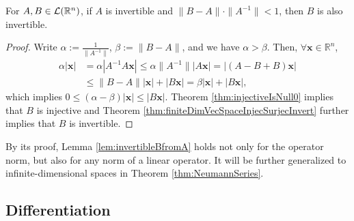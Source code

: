 
\begin{lem}
  \label{lem:invertibleBfromA}
  For $A,B\in {\cal L}(\mathbb{R}^n)$,
  if $A$ is invertible and $\|B-A\|\cdot\|A^{-1}\|<1$,
  then $B$ is also invertible.
\end{lem}
\begin{proof}
  Write $\alpha := \frac{1}{\|A^{-1}\|}$, $\beta := \|B-A\|$,
  and we have $\alpha>\beta$. 
  Then, $\forall \mathbf{x}\in\mathbb{R}^n$,
  \begin{displaymath}
    \begin{array}{rl}
      \alpha |\mathbf{x}|
      &= \alpha|A^{-1}A \mathbf{x}|
        \le \alpha\|A^{-1}\| |A\mathbf{x}|
        = |(A-B+B)\mathbf{x}|
      \\
      & \le \|B-A\||\mathbf{x}| + |B\mathbf{x}|
        = \beta |\mathbf{x}| + |B\mathbf{x}|, 
    \end{array}
  \end{displaymath}
  which implies $0\le (\alpha-\beta)|\mathbf{x}|\le |B\mathbf{x}|$.
  Theorem \ref{thm:injectiveIsNull0} implies that
  $B$ is injective and
  Theorem \ref{thm:finiteDimVecSpaceInjecSurjecInvert}
  further implies that $B$ is invertible.
\end{proof}

\begin{rem}
  By its proof, Lemma \ref{lem:invertibleBfromA} holds not only
  for the operator norm,
  but also for any norm of a linear operator. 
  It will be further generalized to infinite-dimensional spaces
  in Theorem \ref{thm:NeumannSeries}.
\end{rem}


\subsection{Differentiation}

